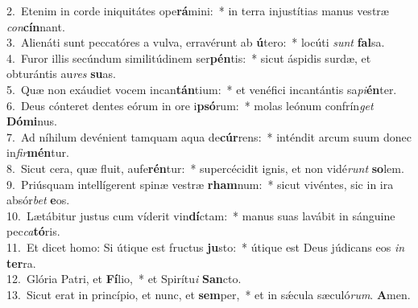 {2.~}Etenim in corde iniquitátes ope\textbf{rá}mini:~* in terra injustítias manus vestræ \textit{con}\textbf{cín}nant.\\
{3.~}Alienáti sunt peccatóres a vulva, erravérunt ab \textbf{ú}tero:~* locúti \textit{sunt} \textbf{fal}sa.\\
{4.~}Furor illis secúndum similitúdinem ser\textbf{pén}tis:~* sicut áspidis surdæ, et obturántis au\textit{res} \textbf{su}as.\\
{5.~}Quæ non exáudiet vocem incan\textbf{tán}tium:~* et venéfici incantántis sa\textit{pi}\textbf{én}ter.\\
{6.~}Deus cónteret dentes eórum in ore i\textbf{psó}rum:~* molas leónum confrín\textit{get} \textbf{Dó}\textbf{mi}nus.\\
{7.~}Ad níhilum devénient tamquam aqua de\textbf{cúr}rens:~* inténdit arcum suum donec in\textit{fir}\textbf{mén}tur.\\
{8.~}Sicut cera, quæ fluit, aufe\textbf{rén}tur:~* supercécidit ignis, et non vidé\textit{runt} \textbf{so}lem.\\
{9.~}Priúsquam intellígerent spinæ vestræ \textbf{rham}num:~* sicut vivéntes, sic in ira absór\textit{bet} \textbf{e}os.\\
{10.~}Lætábitur justus cum víderit vin\textbf{dí}ctam:~* manus suas lavábit in sánguine pec\textit{ca}\textbf{tó}ris.\\
{11.~}Et dicet homo: Si útique est fructus \textbf{ju}sto:~* útique est Deus júdicans eos \textit{in} \textbf{ter}ra.\\
{12.~}Glória Patri, et \textbf{Fí}lio,~* et Spirítu\textit{i} \textbf{San}cto.\\
{13.~}Sicut erat in princípio, et nunc, et \textbf{sem}per,~* et in sǽcula sæculó\textit{rum}. \textbf{A}men.\\
